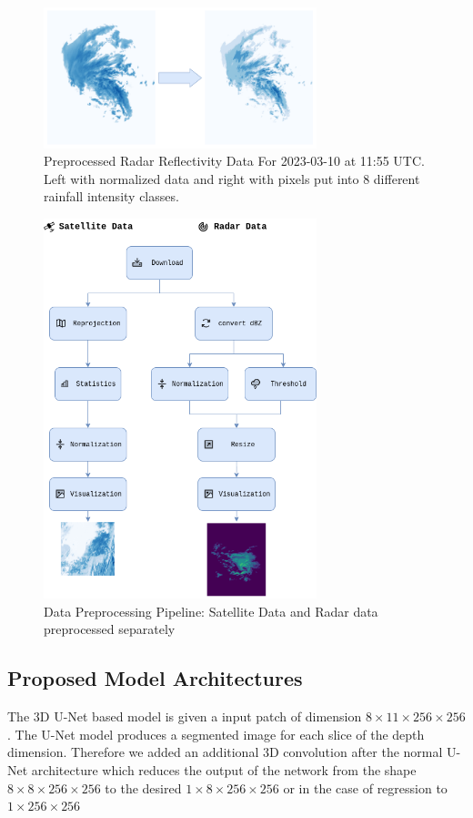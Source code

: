 \begin{figure}
  \centering
  \includegraphics[width=225pt]{./images/bins.png}
  \caption{Preprocessed Radar Reflectivity Data For 2023-03-10 at 11:55 UTC. Left with normalized data and right with pixels put into 8 different rainfall intensity classes.}
  \label{fig:bins}
\end{figure}


\begin{figure}
  \centering
  \includegraphics[width=225pt]{./images/prepro.png}
  \caption{Data Preprocessing Pipeline: Satellite Data and Radar data preprocessed separately}
  \label{fig:preprocessing}
\end{figure}

\subsection{Proposed Model Architectures}

The 3D U-Net based model is given a input patch of dimension $8\times11\times256\times256$. The U-Net model produces a segmented image for each slice of the depth dimension.
Therefore we added an additional 3D convolution after the normal U-Net architecture which reduces the output of the network from the shape $8\times8\times256\times256$ to the desired $1\times8\times256\times256$ or in the case of regression to $1\times256\times256$
\medskip



